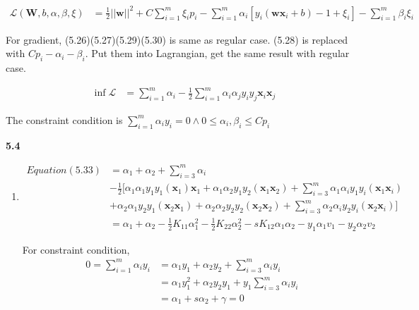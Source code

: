 \documentclass[12pt]{article}
\begin{document}
\begin{align*}
    \mathcal{L}(\mathbf{W}, b, \alpha, \beta, \xi) &= \frac{1}{2}||\mathbf{w}||^2 + 
        C\sum_{i=1}^{m} \xi_{i}p_{i} - \sum_{i=1}^{m} \alpha_{i}[y_{i}(\mathbf{w}\mathbf{x}_{i} + b) - 1 + 
        \xi_{i}] - \sum_{i=1}^{m} \beta_{i}\xi_{i}
\end{align*}

For gradient, (5.26)(5.27)(5.29)(5.30) is same as regular case. (5.28) is replaced with $Cp_{i} - 
\alpha_{i} - \beta_{i}$. Put them into Lagrangian, get the same result with regular case.

\begin{align*}
    \inf \mathcal{L} &= \sum_{i=1}^{m}\alpha_{i} - \frac{1}{2}\sum_{i=1}^{m}\alpha_{i}\alpha_{j}y_{i}y_{j}\mathbf{x}_{i}\mathbf{x}_{j}
\end{align*}

The constraint condition is $\sum_{i=1}^{m}\alpha_{i}y_{i}=0 \wedge 0 \le \alpha_{i}, \beta_{i} \le Cp_{i}$

\vspace{1em}  %

\noindent \textbf{5.4}

\begin{enumerate}[label=(\alph*), left=0pt]
    \item 
    \begin{align*}
        Equation (5.33) &= \alpha_{1}+\alpha_{2}+\sum_{i=3}^{m}\alpha_{i} \\
        &- \frac{1}{2}[\alpha_{1}\alpha_{1}y_{1}y_{1}(\textbf{x}_{1})\textbf{x}_{1} 
        + \alpha_{1}\alpha_{2}y_{1}y_{2}(\textbf{x}_{1}\textbf{x}_{2}) 
        + \sum_{i=3}^{m}\alpha_{1}\alpha_{i}y_{1}y_{i}(\textbf{x}_{1}\textbf{x}_{i}) \\
        &+ \alpha_{2}\alpha_{1}y_{2}y_{1}(\textbf{x}_{2}\textbf{x}_{1}) 
        + \alpha_{2}\alpha_{2}y_{2}y_{2}(\textbf{x}_{2}\textbf{x}_{2}) 
        + \sum_{i=3}^{m}\alpha_{2}\alpha_{i}y_{2}y_{i}(\textbf{x}_{2}\textbf{x}_{i})] \\
        &= \alpha_{1}+\alpha_{2}-\frac{1}{2}K_{11}\alpha_{1}^{2}-\frac{1}{2}K_{22}\alpha_{2}^{2}-sK_{12}\alpha_{1}\alpha_{2}-y_{1}\alpha_{1}v_{1}-y_{2}\alpha_{2}v_{2}
    \end{align*}

    For constraint condition, \\
    \begin{align*}
        0 = \sum_{i=1}^{m}\alpha_{i}y_{i} &= \alpha_{1}y_{1}+\alpha_{2}y_{2}+\sum_{i=3}^{m}\alpha_{i}y_{i} \\
        &= \alpha_{1}y_{1}^{2}+\alpha_{2}y_{2}y_{1}+y_{1}\sum_{i=3}^{m}\alpha_{i}y_{i} \\
        &= \alpha_{1} + s\alpha_{2} + \gamma = 0
    \end{align*}
\end{enumerate}
\end{document}
